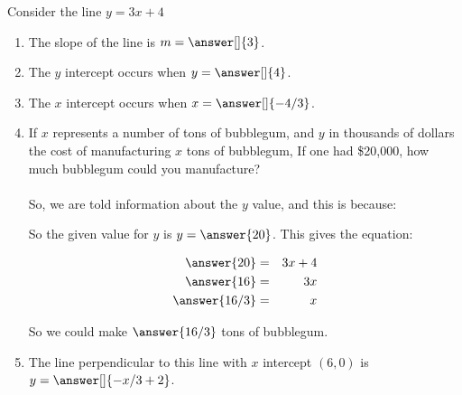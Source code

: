 \documentclass{ximera}
\begin{document}
\begin{question}
Consider the line $y=3x+4$

\begin{enumerate}
\item The slope of the line is $m=\answer[]{3}$.
\item The $y$ intercept occurs when $y=\answer[]{4}$.
\item The $x$ intercept occurs when $x=\answer[]{-4/3}$.
\item  If $x$ represents a number of tons of bubblegum, and $y$ in thousands of dollars the cost of manufacturing $x$ tons of bubblegum,  If one had \$20,000, how much bubblegum could you manufacture?\\ \\

So, we are told information about the $y$ value, and this is because:

\begin{multipleChoice}
\end{multipleChoice}

So the given value for $y$ is $y=\answer{20}$.  This gives the equation:

\begin{eqnarray*}
\answer{20}&=&3x+4\\
\answer{16}&=&3x\\
\answer{16/3}&=&x\\
\end{eqnarray*}

So we could make $\answer{16/3}$ tons of bubblegum.

\item The line perpendicular to this line with $x$ intercept $(6,0)$ is   $y=\answer[]{-x/3+2}$.
\end{enumerate}


\end{question}
\end{document}
